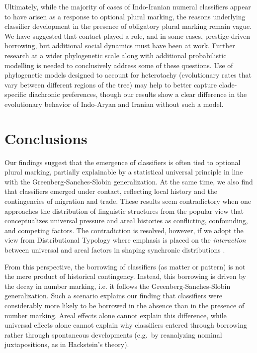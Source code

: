 \documentclass[11pt]{article}
\begin{document}
Ultimately, while the majority of cases of Indo-Iranian numeral classifiers appear to have arisen as a response to optional plural marking, the reasons underlying classifier development in the presence of obligatory plural marking remain vague. 
We have suggested that contact played a role, and in some cases, prestige-driven borrowing, but additional social dynamics must have been at work. 
Further research at a wider phylogenetic scale along with additional probabilistic modelling is needed to conclusively address some of these questions.
Use of phylogenetic models designed to account for heterotachy (evolutionary rates that vary between different regions of the tree) may help to better capture clade-specific diachronic preferences, though our results show a clear difference in the evolutionary behavior of Indo-Aryan and Iranian without such a model.


\section{Conclusions}
\label{conc}
Our findings suggest that the emergence of classifiers is often tied to optional plural marking, partially explainable by a statistical universal principle in line with the Greenberg-Sanches-Slobin generalization. 
At the same time, we also find that classifiers emerged under contact, reflecting local history and the contingencies of migration and trade. These results seem contradictory when one approaches the distribution of linguistic structures from the popular view that conceptualizes universal pressure and areal histories as conflicting, confounding, and competing factors. The contradiction is resolved, however, if we adopt the view from Distributional Typology \citep{Bickel2015Distributional} where emphasis is placed on the \emph{interaction} between universal and areal factors in shaping synchronic distributions \citep{Bickel2014Areas}. 

From this perspective, the borrowing of classifiers (as matter or pattern) is not the mere product of historical contingency. Instead, this borrowing is driven by the decay in number marking, i.e. it follows the Greenberg-Sanches-Slobin generalization. Such a scenario explains our finding that classifiers were considerably more likely to be borrowed in the absence than in the presence of number marking. Areal effects alone cannot explain this difference, while universal effects alone cannot explain why classifiers entered through borrowing rather through spontaneous developments (e.g.\ by reanalyzing nominal juxtapositions, as in Hackstein's \citeyear{Hackstein2010} theory).
\end{document}
